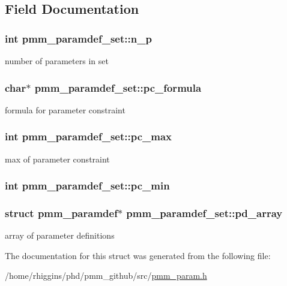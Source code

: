 \subsection{Field Documentation}
\hypertarget{structpmm__paramdef__set_aaf2e3c0d854fddee13df808d7b8c13e8}{
\subsubsection[{n\-\_\-p}]{\setlength{\rightskip}{0pt plus 5cm}int pmm\-\_\-paramdef\-\_\-set\-::n\-\_\-p}}\label{structpmm__paramdef__set_aaf2e3c0d854fddee13df808d7b8c13e8}
number of parameters in set \hypertarget{structpmm__paramdef__set_a464c3f385beb49086fbea74a3ce229d0}{
\subsubsection[{pc\-\_\-formula}]{\setlength{\rightskip}{0pt plus 5cm}char$\ast$ pmm\-\_\-paramdef\-\_\-set\-::pc\-\_\-formula}}\label{structpmm__paramdef__set_a464c3f385beb49086fbea74a3ce229d0}
formula for parameter constraint \hypertarget{structpmm__paramdef__set_a9749805cd8bc1b6ccd757cc9148683d8}{
\subsubsection[{pc\-\_\-max}]{\setlength{\rightskip}{0pt plus 5cm}int pmm\-\_\-paramdef\-\_\-set\-::pc\-\_\-max}}\label{structpmm__paramdef__set_a9749805cd8bc1b6ccd757cc9148683d8}
max of parameter constraint \hypertarget{structpmm__paramdef__set_ab69c42d0bb271fb104d45d5f9266e645}{
\subsubsection[{pc\-\_\-min}]{\setlength{\rightskip}{0pt plus 5cm}int pmm\-\_\-paramdef\-\_\-set\-::pc\-\_\-min}}\label{structpmm__paramdef__set_ab69c42d0bb271fb104d45d5f9266e645}
\hypertarget{structpmm__paramdef__set_a21002ef85eabb0d96750c6a0cdce96c0}{
\subsubsection[{pd\-\_\-array}]{\setlength{\rightskip}{0pt plus 5cm}struct {\bf pmm\-\_\-paramdef}$\ast$ pmm\-\_\-paramdef\-\_\-set\-::pd\-\_\-array}}\label{structpmm__paramdef__set_a21002ef85eabb0d96750c6a0cdce96c0}
array of parameter definitions 

The documentation for this struct was generated from the following file\-:\begin{DoxyCompactItemize}
\item 
/home/rhiggins/phd/pmm\-\_\-github/src/\hyperlink{pmm__param_8h}{pmm\-\_\-param.\-h}\end{DoxyCompactItemize}
